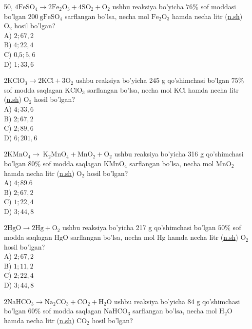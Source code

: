 50, $4 \mathrm{FeSO}_{4} \rightarrow 2 \mathrm{Fe}_{2} \mathrm{O}_{3}+4 \mathrm{SO}_{2}+\mathrm{O}_{2}$ ushbu reaksiya bo'yicha $76 \%$ sof moddasi bo'lgan $200 \mathrm{~g} \mathrm{FeSO}_{4}$ sarflangan bo'lsa, necha mol $\mathrm{Fe}_{2} \mathrm{O}_{3}$ hamda necha litr (\href{http://n.sh}{n.sh}) $\mathrm{O}_{2}$ hosil bo'lgan?\\
A) $2 ; 67,2$\\
B) $4 ; 22,4$\\
C) 0,$5 ; 5,6$\\
D) $1 ; 33,6$
  \item $2 \mathrm{KClO}_{3} \longrightarrow 2 \mathrm{KCl}+3 \mathrm{O}_{2}$ ushbu reaksiya bo'yicha 245 g qo'shimchasi bo'lgan $75 \%$ sof modda saqlagan $\mathrm{KClO}_{3}$ sarflangan bo'lsa, necha mol KCl hamda necha litr (\href{http://n.sh}{n.sh}) $\mathrm{O}_{2}$ hosil bo'lgan?\\
A) $4 ; 33,6$\\
B) $2 ; 67,2$\\
C) $2 ; 89,6$\\
D) $6 ; 201,6$
  \item $2 \mathrm{KMnO}_{4} \rightarrow \mathrm{~K}_{2} \mathrm{MnO}_{4}+\mathrm{MnO}_{2}+\mathrm{O}_{2}$ ushbu reaksiya bo'yicha 316 g qo'shimchasi bo'lgan $80 \%$ sof modda saqlagan $\mathrm{KMnO}_{4}$ sarflangan bo'lsa, necha mol $\mathrm{MnO}_{2}$ hamda necha litr (\href{http://n.sh}{n.sh}) $\mathrm{O}_{2}$ hosil bo'lgan?\\
A) $4 ; 89.6$\\
B) $2 ; 67,2$\\
C) $1 ; 22,4$\\
D) $3 ; 44,8$
  \item $2 \mathrm{HgO} \rightarrow 2 \mathrm{Hg}+\mathrm{O}_{2}$ ushbu reaksiya bo'yicha 217 g qo'shimchasi bo'lgan $50 \%$ sof modda saqlagan HgO sarflangan bo'lsa, necha mol Hg hamda necha litr (\href{http://n.sh}{n.sh}) $\mathrm{O}_{2}$ hosil bo'lgan?\\
A) $2 ; 67,2$\\
B) $1 ; 11,2$\\
C) $2 ; 22,4$\\
D) $3 ; 44,8$
  \item $2 \mathrm{NaHCO}_{3} \rightarrow \mathrm{Na}_{2} \mathrm{CO}_{3}+\mathrm{CO}_{2}+\mathrm{H}_{2} \mathrm{O}$ ushbu reaksiya bo'yicha 84 g qo'shimchasi bo'lgan $60 \%$ sof modda saqlagan $\mathrm{NaHCO}_{3}$ sarflangan bo'lsa, necha mol $\mathrm{H}_{2} \mathrm{O}$ hamda necha litr (\href{http://n.sh}{n.sh}) $\mathrm{CO}_{2}$ hosil bo'lgan?\\
